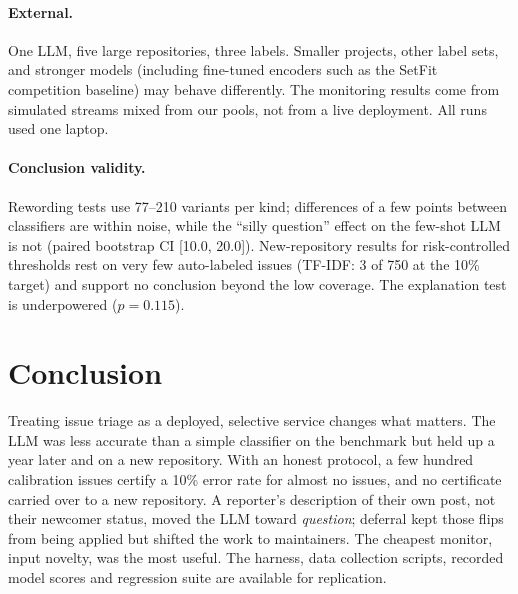 \paragraph{External.} One LLM, five large repositories, three labels. Smaller projects, other label
sets, and stronger models (including fine-tuned encoders such as the SetFit competition baseline)
may behave differently. The monitoring results come from simulated streams mixed from our pools,
not from a live deployment. All runs used one laptop.

\paragraph{Conclusion validity.} Rewording tests use 77--210 variants per kind; differences of a few
points between classifiers are within noise, while the ``silly question'' effect on the few-shot LLM
is not (paired bootstrap CI [10.0, 20.0]). New-repository results for risk-controlled thresholds rest
on very few auto-labeled issues (TF-IDF: 3 of 750 at the 10\% target) and support no conclusion
beyond the low coverage. The explanation test is underpowered ($p{=}0.115$).

\section{Conclusion}
Treating issue triage as a deployed, selective service changes what matters. The LLM was less
accurate than a simple classifier on the benchmark but held up a year later and on a new repository.
With an honest protocol, a few hundred calibration issues certify a 10\% error rate for almost no
issues, and no certificate carried over to a new repository. A reporter's description of their own
post, not their newcomer status, moved the LLM toward \emph{question}; deferral kept those flips from
being applied but shifted the work to maintainers. The cheapest monitor, input novelty, was the most
useful. The harness, data collection scripts, recorded model scores and regression suite are
available for replication.
